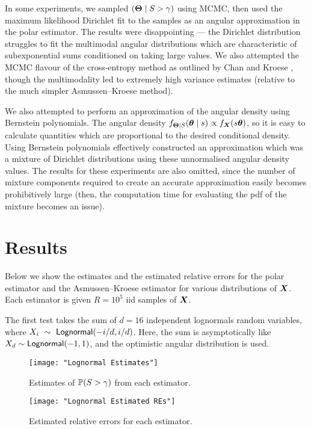 In some experiments, we sampled $(\bm{\Theta} \mid S > \gamma)$ using MCMC, then used the maximum likelihood Dirichlet fit to the samples as an angular approximation in the polar estimator. The results were disappointing --- the Dirichlet distribution struggles to fit the multimodal angular distributions which are characteristic of subexponential sums conditioned on taking large values. We also attempted the MCMC flavour of the cross-entropy method as outlined by Chan and Kroese \cite{chan2012improved}, though the multimodality led to extremely high variance estimates (relative to the much simpler Asmussen--Kroese method).

We also attempted to perform an approximation of the angular density using Bernstein polynomials. The angular density $f_{\bm{\Theta} \mid S}(\bm{\theta} \mid s) \propto f_{\bm{X}}(s \bm{\theta})$, so it is easy to calculate quantities which are proportional to the desired conditional density. Using Bernstein polynomials effectively constructed an approximation which was a mixture of Dirichlet distributions using these unnormalised angular density values. The results for these experiments are also omitted, since the number of mixture components required to create an accurate approximation easily becomes prohibitively large (then, the computation time for evaluating the pdf of the mixture becomes an issue).

\section{Results} \label{Sec:Results}

Below we show the estimates and the estimated relative errors for the polar estimator and the Asmussen--Kroese estimator for various distributions of $\bm{X}$. Each estimator is given $R = 10^5$ iid samples of $\bm{X}$.

The first test takes the sum of $d=16$ independent lognormals random variables, where $X_i~\sim~\mathsf{Lognormal}(-i/d, i/d)$. Here, the sum is asymptotically like $X_d \sim \mathsf{Lognormal}(-1, 1)$, and the optimistic angular distribution is used.
\begin{figure}[H]
	\centering
	\texttt{[image: "Lognormal Estimates"]}
	\caption{Estimates of $\operatorname{{\mathbb P}}(S > \gamma)$ from each estimator.}
\end{figure}

\begin{figure}[H]
	\centering
	\texttt{[image: "Lognormal Estimated REs"]}
	\caption{Estimated relative errors for each estimator.}
\end{figure}

